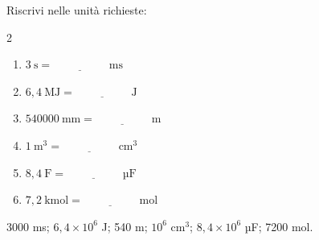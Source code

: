 \begin{question}[ID=2.2, subtitle={Conversioni di unità miste}, tags={conversioni, unità di misura}, difficulty=media]
Riscrivi nelle unità richieste:
\begin{center}\begin{minipage}{0.92\linewidth}
\begin{multicols}{2}
\begin{enumerate}
\item $3\ \text{s} = \underline{\hspace{2cm}}\ \text{ms}$
\item $6{,}4\ \text{MJ} = \underline{\hspace{2cm}}\ \text{J}$
\item $540000\ \text{mm} = \underline{\hspace{2cm}}\ \text{m}$
\item $1\ \text{m}^3 = \underline{\hspace{2cm}}\ \text{cm}^3$
\item $8{,}4\ \text{F} = \underline{\hspace{2cm}}\ \text{µF}$
\item $7{,}2\ \text{kmol} = \underline{\hspace{2cm}}\ \text{mol}$
\end{enumerate}
\end{multicols}
\end{minipage}\end{center}
\begin{solution}
3000 ms; $6{,}4\times10^{6}$ J; 540 m; $10^{6}$ cm$^3$; $8{,}4\times10^{6}$ µF; 7200 mol.
\end{solution}
\end{question}


